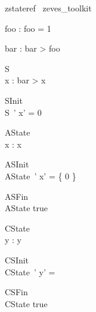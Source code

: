 \begin{zsection}	 \SECTION zstateref \parents~zeves\_toolkit
\end{zsection}



\begin{axdef}foo : \nat 
\where
 foo = 1
\end{axdef}



\begin{axdef}bar : \nat 
\where
 bar > foo
\end{axdef}




\begin{schema}{S}
\\
 x : \nat 
\where
 bar > x
\end{schema}



\begin{schema}{SInit}
\\
 S~' 
\where
 x' = 0
\end{schema}



\begin{schema}{AState}
\\
 x : \power \nat 
\where
 x \neq \emptyset
\end{schema}



\begin{schema}{ASInit}
\\
 AState~' 
\where
 x' = \{ 0 \}
\end{schema}



\begin{schema}{ASFin}
\\
 AState 
\where
 true
\end{schema}



\begin{schema}{CState}
\\
 y : \seq \nat 
\where
 y \neq \langle \rangle
\end{schema}



\begin{schema}{CSInit}
\\
 CState~' 
\where
 y' =~ \rangle
\end{schema}



\begin{schema}{CSFin}
\\
 CState 
\where
 true
\end{schema}



